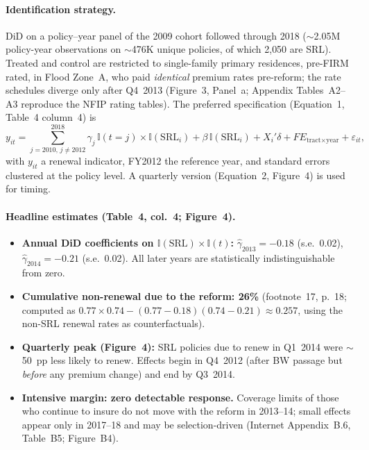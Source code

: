 \documentclass[11pt]{article}
\begin{document}
\paragraph{Identification strategy.}
DiD on a policy--year panel of the 2009 cohort followed through 2018
($\sim$2.05M policy-year observations on $\sim$476K unique policies, of
which 2{,}050 are SRL). Treated and control are restricted to single-family
primary residences, pre-FIRM rated, in Flood Zone~A, who paid
\emph{identical} premium rates pre-reform; the rate schedules diverge
only after Q4~2013 (Figure~3, Panel~a; Appendix Tables~A2--A3 reproduce the
NFIP rating tables). The preferred specification (Equation~1, Table~4
column~4) is
\[
y_{it} = \!\!\sum_{j=2010,\,j\ne 2012}^{2018}\!\!\gamma_j\,\mathbb{I}(t{=}j)\times \mathbb{I}(\mathrm{SRL}_i)
+ \beta\,\mathbb{I}(\mathrm{SRL}_i) + X_i'\delta + FE_{\text{tract}\times\text{year}} + \varepsilon_{it},
\]
with $y_{it}$ a renewal indicator, FY2012 the reference year, and standard
errors clustered at the policy level. A quarterly version (Equation~2,
Figure~4) is used for timing.

\paragraph{Headline estimates (Table~4, col.~4; Figure~4).}
\begin{itemize}
\item \textbf{Annual DiD coefficients on $\mathbb{I}(\mathrm{SRL})\times\mathbb{I}(t)$:}
$\hat\gamma_{2013} = -0.18$ (s.e.\ 0.02), $\hat\gamma_{2014} = -0.21$
(s.e.\ 0.02). All later years are statistically indistinguishable from zero.
\item \textbf{Cumulative non-renewal due to the reform: 26\%}
(footnote~17, p.~18; computed as $0.77\times 0.74 - (0.77{-}0.18)(0.74{-}0.21)
\approx 0.257$, using the non-SRL renewal rates as counterfactuals).
\item \textbf{Quarterly peak (Figure~4):} SRL policies due to renew in Q1~2014
were $\sim$50~pp less likely to renew. Effects begin in Q4~2012 (after BW
passage but \emph{before} any premium change) and end by Q3~2014.
\item \textbf{Intensive margin: zero detectable response.} Coverage limits
of those who continue to insure do not move with the reform in 2013--14;
small effects appear only in 2017--18 and may be selection-driven (Internet
Appendix~B.6, Table~B5; Figure~B4).
\end{itemize}
\end{document}
